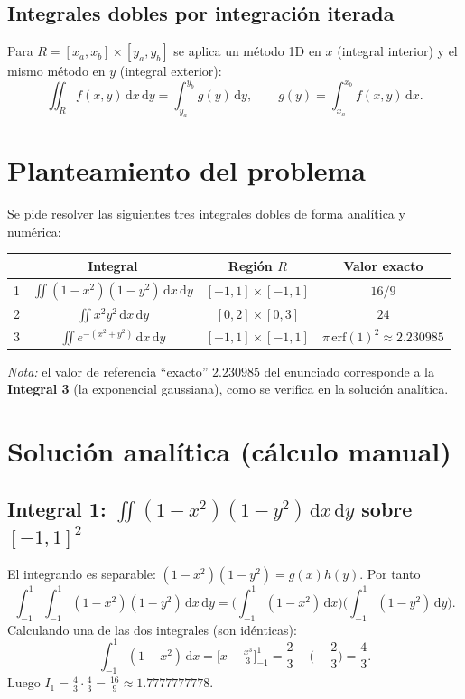 \documentclass[12pt,a4paper]{article}
\newcommand{\dd}{\,\mathrm{d}}
\begin{document}
\subsection{Integrales dobles por integración iterada}
Para $R=[x_a,x_b]\times[y_a,y_b]$ se aplica un método 1D en $x$ (integral
interior) y el mismo método en $y$ (integral exterior):
\[
  \iint_R f(x,y)\dd x\dd y
  = \int_{y_a}^{y_b} g(y)\dd y,\qquad
  g(y)=\int_{x_a}^{x_b} f(x,y)\dd x .
\]
\section{Planteamiento del problema}
Se pide resolver las siguientes tres integrales dobles de forma analítica y
numérica:

\begin{center}
\begin{tabular}{c c c c}
\toprule
 & Integral & Región $R$ & Valor exacto \\
\midrule
1 & $\displaystyle\iint (1-x^2)(1-y^2)\dd x\dd y$ & $[-1,1]\times[-1,1]$ & $16/9$ \\[4pt]
2 & $\displaystyle\iint x^2 y^2\dd x\dd y$ & $[0,2]\times[0,3]$ & $24$ \\[4pt]
3 & $\displaystyle\iint e^{-(x^2+y^2)}\dd x\dd y$ & $[-1,1]\times[-1,1]$ & $\pi\,\mathrm{erf}(1)^2\approx 2.230985$ \\
\bottomrule
\end{tabular}
\end{center}

\noindent\textit{Nota:} el valor de referencia ``exacto'' $2.230985$ del
enunciado corresponde a la \textbf{Integral 3} (la exponencial gaussiana),
como se verifica en la solución analítica.

\section{Solución analítica (cálculo manual)}

\subsection{Integral 1: $\iint (1-x^2)(1-y^2)\dd x\dd y$ sobre $[-1,1]^2$}
El integrando es separable: $(1-x^2)(1-y^2)=g(x)h(y)$. Por tanto
\[
  \int_{-1}^{1}\!\int_{-1}^{1}(1-x^2)(1-y^2)\dd x\dd y
  =\Big(\int_{-1}^{1}(1-x^2)\dd x\Big)\Big(\int_{-1}^{1}(1-y^2)\dd y\Big).
\]
Calculando una de las dos integrales (son idénticas):
\[
  \int_{-1}^{1}(1-x^2)\dd x
  =\Big[x-\tfrac{x^3}{3}\Big]_{-1}^{1}
  =\frac{2}{3}-\Big(-\frac{2}{3}\Big)
  =\frac{4}{3}.
\]
Luego $I_1=\frac{4}{3}\cdot\frac{4}{3}=\frac{16}{9}\approx 1.7777777778$.
\end{document}
